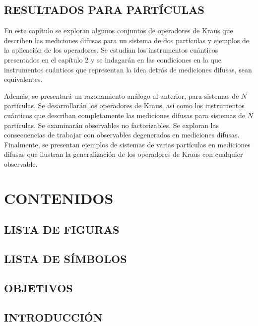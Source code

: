 \documentclass[12pt,oneside]{book}\raggedbottom{} %
\begin{document}
\begin{sloppypar}
{{\section{RESULTADOS PARA \texorpdfstring{}{N} PARTÍCULAS}
En este capítulo se exploran algunos conjuntos de operadores de Kraus que describen las mediciones difusas para un sistema de dos partículas y ejemplos de la aplicación de los operadores. Se estudian los instrumentos cuánticos presentados en el capítulo 2 y se indagarán en las condiciones en la que instrumentos cuánticos que representan la idea detrás de mediciones difusas, sean equivalentes. 

Además, se presentará un razonamiento análogo al anterior, para sistemas de $N$ partículas. Se  desarrollarán los operadores de Kraus, así como los instrumentos cuánticos que describan completamente las mediciones difusas para sistemas de $N$ partículas. Se examinarán observables no factorizables. Se exploran las consecuencias de trabajar con observables degenerados en mediciones difusas.  Finalmente, se presentan ejemplos de sistemas de varias partículas en mediciones difusas que ilustran la generalización de los operadores de Kraus con cualquier observable.  

\chapter{CONTENIDOS} %


\section*{LISTA DE FIGURAS}



\section*{LISTA DE SÍMBOLOS}

\section*{OBJETIVOS}

\section*{INTRODUCCIÓN}

}}
\end{sloppypar}
\end{document}
